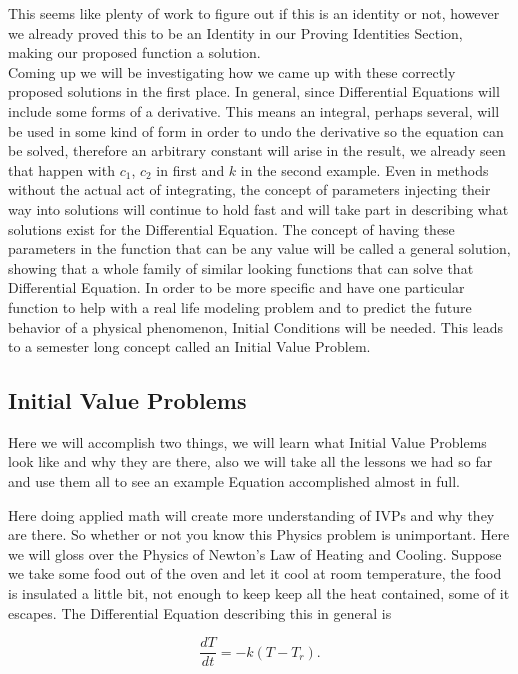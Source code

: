 \documentclass[12pt]{article}
\begin{document}
This seems like plenty of work to figure out if this is an identity or not, however we already proved this to be an Identity in our Proving Identities Section, making our proposed function a solution. \\

Coming up we will be investigating how we came up with these correctly proposed solutions in the first place. In general, since Differential Equations will include some forms of a derivative. This means an integral, perhaps several, will be used in some kind of form in order to undo the derivative so the equation can be solved, therefore an arbitrary constant will arise in the result, we already seen that happen with $c_1$, $c_2$ in first and $k$ in the second example. Even in methods without the actual act of integrating, the concept of parameters injecting their way into solutions will continue to hold fast and will take part in describing what solutions exist for the Differential Equation. The concept of having these parameters in the function that can be any value will be called a general solution, showing that a whole family of similar looking functions that can solve that Differential Equation. In order to be more specific and have one particular function to help with a real life modeling problem and to predict the future behavior of a physical phenomenon, Initial Conditions will be needed. This leads to a semester long concept called an Initial Value Problem.

\subsection{Initial Value Problems}

Here we will accomplish two things, we will learn what Initial Value Problems look like and why they are there, also we will take all the lessons we had so far and use them all to see an example Equation accomplished almost in full.

Here doing applied math will create more understanding of IVPs and why they are there. So whether or not you know this Physics problem is unimportant. Here we will gloss over the Physics of Newton's Law of Heating and Cooling. Suppose we take some food out of the oven and let it cool at room temperature, the food is insulated a little bit, not enough to keep keep all the heat contained, some of it escapes. The Differential Equation describing this in general is 

\begin{equation*}
    \frac{dT}{dt}=-k(T-T_r).
\end{equation*}
\end{document}
